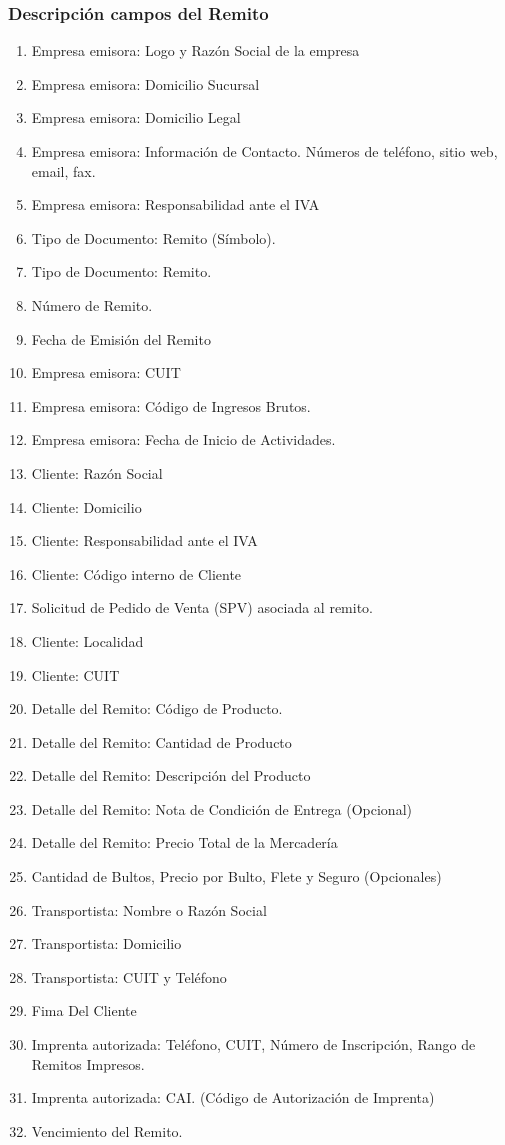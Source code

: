 \subsubsection{Descripci\'on campos del Remito}

\begin{enumerate}

   \item Empresa emisora: Logo y Raz\'on Social de la empresa
   \item Empresa emisora: Domicilio Sucursal
   \item Empresa emisora: Domicilio Legal
   \item Empresa emisora: Informaci\'on de Contacto. N\'umeros de tel\'efono, sitio web, email, fax.
   \item Empresa emisora: Responsabilidad ante el IVA
   \item Tipo de Documento: Remito (S\'imbolo).
   \item Tipo de Documento: Remito.
   \item N\'umero de Remito.
   \item Fecha de Emisi\'on del Remito
   \item Empresa emisora: CUIT
   \item Empresa emisora: C\'odigo de Ingresos Brutos.
   \item Empresa emisora: Fecha de Inicio de Actividades.
   \item Cliente: Raz\'on Social
   \item Cliente: Domicilio 
   \item Cliente: Responsabilidad ante el IVA
   \item Cliente: C\'odigo interno de Cliente
   \item Solicitud de Pedido de Venta (SPV) asociada al remito.
   \item Cliente: Localidad
   \item Cliente: CUIT
   \item Detalle del Remito: C\'odigo de Producto.
   \item Detalle del Remito: Cantidad de Producto
   \item Detalle del Remito: Descripci\'on del Producto
   \item Detalle del Remito: Nota de Condici\'on de Entrega (Opcional)
   \item Detalle del Remito: Precio Total de la Mercader\'ia
   \item Cantidad de Bultos, Precio por Bulto, Flete y Seguro (Opcionales)
   \item Transportista: Nombre o Raz\'on Social
   \item Transportista: Domicilio
   \item Transportista: CUIT y Tel\'efono
   \item Fima Del Cliente
   \item Imprenta autorizada: Tel\'efono, CUIT, N\'umero de Inscripci\'on, Rango de Remitos Impresos.
   \item Imprenta autorizada: CAI. (C\'odigo de Autorizaci\'on de Imprenta)
   \item Vencimiento del Remito.
  \end{enumerate}
  

